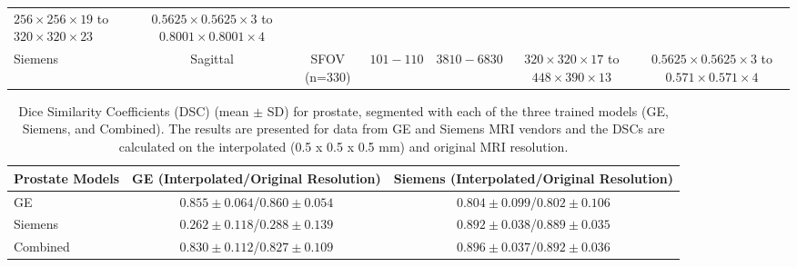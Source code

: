 \begin{table}[ht]
\begin{tabular}{lcccccc}
                \shortstack{$256  \times 256 \times 19$ to \\ $320 \times 320 \times 23$} & 
                \shortstack{$0.5625 \times 0.5625 \times 3$ to\\ $0.8001 \times 0.8001 \times 4$} \\
          Siemens & Sagittal & SFOV (n=330) & $101 - 110$ & $3810 - 6830$&  
                \shortstack{$320  \times 320 \times 17$ to \\ $448 \times 390 \times 13$} &
                \shortstack{$0.5625 \times 0.5625 \times 3$ to\\ $0.571 \times 0.571 \times 4$} \\
         \hline
    \end{tabular}
    \label{tab:dataset}
\end{table} 

\newpage
\begin{table}[ht]
    \caption{Dice Similarity Coefficients (DSC) (mean $\pm$ SD) for prostate, segmented with each of the three trained models (GE, Siemens, and Combined). The results are presented for data from GE and Siemens MRI vendors and the DSCs are calculated on the interpolated (0.5 x 0.5 x 0.5 mm) and original MRI resolution.}
    \begin{tabular}{lcc}
         \hline
          \textbf{Prostate Models} & \textbf{GE (Interpolated/Original Resolution)} & \textbf{Siemens (Interpolated/Original Resolution)}\\
         \hline
         GE & $0.855\pm0.064$/$\mathbf{0.860\pm0.054}$ & $0.804\pm0.099$/$0.802\pm0.106$ \\
         \hline
         Siemens & $0.262\pm0.118$/$0.288\pm0.139$ & $0.892\pm0.038$/$0.889\pm0.035$ \\
         \hline
         Combined & $0.830\pm0.112$/$0.827\pm0.109$ & $\mathbf{0.896\pm0.037}$/$0.892\pm0.036$\\
         \hline
    \end{tabular}
    \label{tab:res_prost}
\end{table} 

